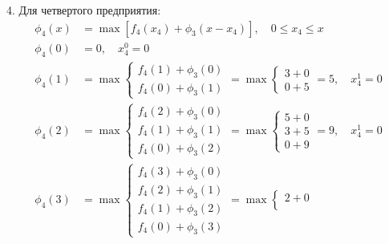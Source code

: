 \documentclass{article}
\begin{document}
4. Для четвертого предприятия:
\[
    \begin{aligned}
        \phi_4(x) & = \max \left[ f_4(x_4) + \phi_3(x - x_4) \right], \quad 0 \leq x_4 \leq x \\
        \phi_4(0) & = 0, \quad x_4^0 = 0                                                      \\
        \phi_4(1) & = \max \begin{cases}
                               f_4(1) + \phi_3(0) \\
                               f_4(0) + \phi_3(1)
                           \end{cases} = \max \begin{cases}
                                                  3 + 0 \\
                                                  0 + 5
                                              \end{cases} = 5, \quad x_4^1 = 0                \\
        \phi_4(2) & = \max \begin{cases}
                               f_4(2) + \phi_3(0) \\
                               f_4(1) + \phi_3(1) \\
                               f_4(0) + \phi_3(2)
                           \end{cases} = \max \begin{cases}
                                                  5 + 0 \\
                                                  3 + 5 \\
                                                  0 + 9
                                              \end{cases} = 9, \quad x_4^1 = 0                \\
        \phi_4(3) & = \max \begin{cases}
                               f_4(3) + \phi_3(0) \\
                               f_4(2) + \phi_3(1) \\
                               f_4(1) + \phi_3(2) \\
                               f_4(0) + \phi_3(3)
                           \end{cases} = \max \begin{cases}
                                                  2 + 0 \\

\end{cases}
\end{aligned}\]
\end{document}

